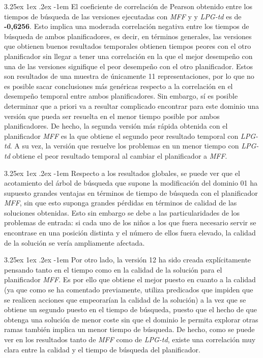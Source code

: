 \documentclass{article}
\makeatletter
\renewcommand\paragraph{\@startsection{paragraph}{5}{\z@}%
      {3.25ex \@plus1ex \@minus.2ex}%
      {-1em}%
      {\normalfont\normalsize\bfseries}}
\makeatother
\begin{document}
    \paragraph{}
    El coeficiente de correlación de Pearson obtenido entre los tiempos de búsqueda de las versiones ejecutadas con \textit{MFF} y y \textit{LPG-td} es de \textbf{-0,6256}. Esto implica una moderada correlación negativa entre los tiempos de búsqueda de ambos planificadores, es decir,  en términos generales, las versiones que obtienen buenos resultados temporales obtienen tiempos peores con el otro planificador sin llegar a tener una correlación en la que el mejor desempeño con una de las versiones signifique el peor desempeño con el otro planificador. Estos son resultados de una muestra de únicamente 11 representaciones, por lo que no es posible sacar conclusiones más genéricas respecto a la correlación en el desempeño temporal entre ambos planificadores. Sin embargo, sí es posible determinar que a priori va a resultar complicado encontrar para este dominio una versión que pueda ser resuelta en el menor tiempo posible por ambos planificadores. De hecho, la segunda versión más rápida obtenida con el planificador \textit{MFF} es la que obtiene el segundo peor resultado temporal con \textit{LPG-td}. A su vez, la versión que resuelve los problemas en un menor tiempo con \textit{LPG-td} obtiene el peor resultado temporal al cambiar el planificador a \textit{MFF}.
    
    \paragraph{}
    Respecto a los resultados globales, se puede ver que el acotamiento del árbol de búsqueda que supone la modificación del dominio 01 ha supuesto grandes ventajas en términos de tiempo de búsqueda con el planificador \textit{MFF}, sin que esto suponga grandes pérdidas en términos de calidad de las soluciones obtenidas. Esto sin embargo se debe a las particularidades de los problemas de entrada: si cada uno de los niños a los que fuera necesario servir se encontrase en una posición distinta y el número de ellos fuera elevado, la calidad de la solución se vería ampliamente afectada.
    
    \paragraph{}
    Por otro lado, la versión 12 ha sido creada explícitamente pensando tanto en el tiempo como en la calidad de la solución para el planificador \textit{MFF}. Es por ello que obtiene el mejor puesto en cuanto a la calidad (ya que como se ha comentado previamente, utiliza predicados que impiden que se realicen acciones que empeorarían la calidad de la solución) a la vez que se obtiene un segundo puesto en el tiempo de búsqueda, puesto que el hecho de que obtenga una solución de menor coste sin que el dominio le permita explorar otras ramas también implica un menor tiempo de búsqueda. De hecho, como se puede ver en los resultados tanto de \textit{MFF} como de \textit{LPG-td}, existe una correlación muy clara entre la calidad y el tiempo de búsqueda del planificador.
    
\end{document}
